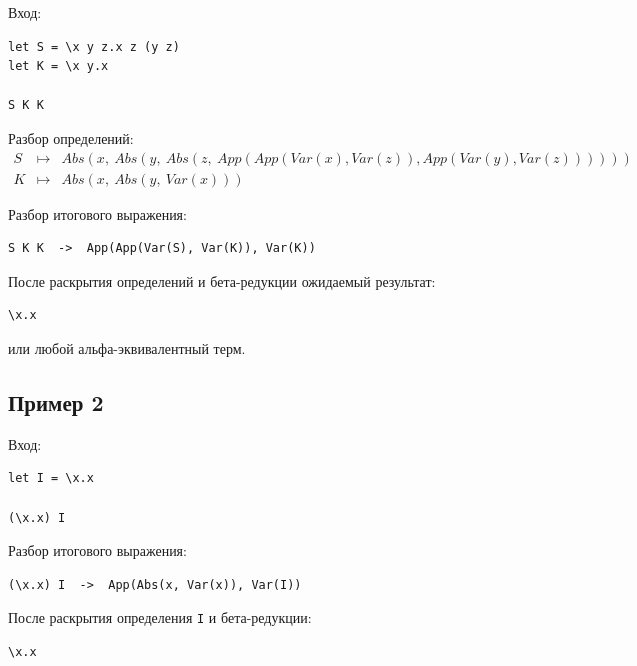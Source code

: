 \documentclass[12pt,a4paper]{article}
\begin{document}
Вход:
\begin{verbatim}
let S = \x y z.x z (y z)
let K = \x y.x

S K K
\end{verbatim}

Разбор определений:
\[
\begin{array}{rcl}
S & \mapsto & Abs(x,\ Abs(y,\ Abs(z,\ App(App(Var(x), Var(z)),
                 App(Var(y), Var(z)))))) \\
K & \mapsto & Abs(x,\ Abs(y,\ Var(x)))
\end{array}
\]

Разбор итогового выражения:
\begin{verbatim}
S K K  ->  App(App(Var(S), Var(K)), Var(K))
\end{verbatim}

После раскрытия определений и бета-редукции ожидаемый результат:
\begin{verbatim}
\x.x
\end{verbatim}
или любой альфа-эквивалентный терм.

\subsection*{Пример 2}

Вход:
\begin{verbatim}
let I = \x.x

(\x.x) I
\end{verbatim}

Разбор итогового выражения:
\begin{verbatim}
(\x.x) I  ->  App(Abs(x, Var(x)), Var(I))
\end{verbatim}

После раскрытия определения \verb|I| и бета-редукции:
\begin{verbatim}
\x.x
\end{verbatim}
\end{document}
